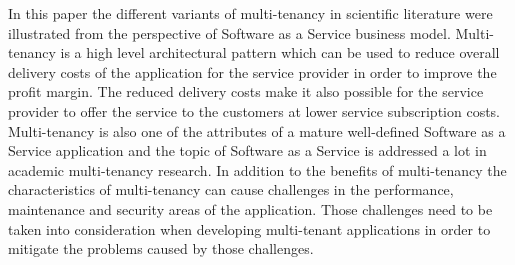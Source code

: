 \documentclass[conference]{sasmoota2017}
\begin{document}
In this paper the different variants of multi-tenancy in scientific literature were illustrated from the perspective of Software as a Service business model. Multi-tenancy is a high level architectural pattern which can be used to reduce overall delivery costs of the application for the service provider in order to improve the profit margin. The reduced delivery costs make it also possible for the service provider to offer the service to the customers at lower service subscription costs. Multi-tenancy is also one of the attributes of a mature well-defined Software as a Service application and the topic of Software as a Service is addressed a lot in academic multi-tenancy research. In addition to the benefits of multi-tenancy the characteristics of multi-tenancy can cause challenges in the performance, maintenance and security areas of the application. Those challenges need to be taken into consideration when developing multi-tenant applications in order to mitigate the problems caused by those challenges. 







%
%
%



%
%



\end{document}
